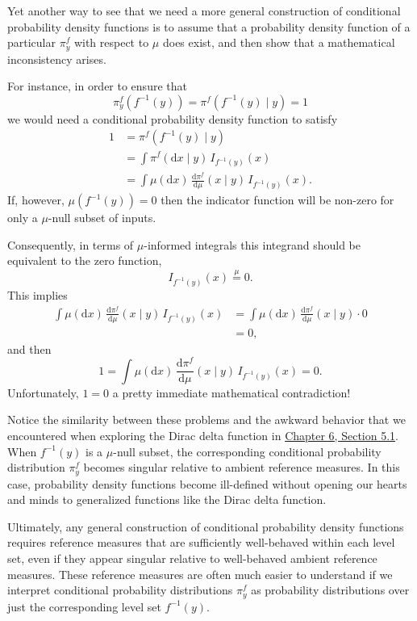 \documentclass[
  letterpaper,
  DIV=11,
  numbers=noendperiod]{scrartcl}
\begin{document}
Yet another way to see that we need a more general construction of
conditional probability density functions is to assume that a
probability density function of a particular \(\pi^{f}_{y}\) with
respect to \(\mu\) does exist, and then show that a mathematical
inconsistency arises.

For instance, in order to ensure that \[
\pi^{f}_{y}( f^{-1}(y) ) = \pi^{f}( f^{-1}(y) \mid y) = 1
\] we would need a conditional probability density function to satisfy
\begin{align*}
1
&=
\pi^{f}( f^{-1}(y) \mid y)
\\
&=
\int \pi^{f}( \mathrm{d} x \mid y) \, I_{f^{-1}(y)}(x)
\\
&=
\int \mu( \mathrm{d} x) \,
\frac{ \mathrm{d}  \pi^{f} }{ \mathrm{d}  \mu  }(x \mid y) \, I_{f^{-1}(y)}(x).
\end{align*} If, however, \(\mu( f^{-1}(y) ) = 0\) then the indicator
function will be non-zero for only a \(\mu\)-null subset of inputs.

Consequently, in terms of \(\mu\)-informed integrals this integrand
should be equivalent to the zero function, \[
I_{f^{-1}(y)}(x) \overset{\mu}{=} 0.
\] This implies \begin{align*}
\int \mu( \mathrm{d} x) \,
\frac{ \mathrm{d}  \pi^{f} }{ \mathrm{d}  \mu  }(x \mid y) \, I_{f^{-1}(y)}(x)
&=
\int \mu( \mathrm{d} x) \,
\frac{ \mathrm{d}  \pi^{f} }{ \mathrm{d}  \mu  }(x \mid y) \cdot 0
\\
&= 0,
\end{align*} and then \[
1 = \int \mu( \mathrm{d} x) \,
\frac{ \mathrm{d}  \pi^{f} }{ \mathrm{d}  \mu  }(x \mid y) \, I_{f^{-1}(y)}(x) = 0.
\] Unfortunately, \(1 = 0\) a pretty immediate mathematical
contradiction!

Notice the similarity between these problems and the awkward behavior
that we encountered when exploring the Dirac delta function in
\href{http://www.symplectomorphic.com/assets/chapters_html/density_functions.html}{Chapter
6, Section 5.1}. When \(f^{-1}(y)\) is a \(\mu\)-null subset, the
corresponding conditional probability distribution \(\pi^{f}_{y}\)
becomes singular relative to ambient reference measures. In this case,
probability density functions become ill-defined without opening our
hearts and minds to generalized functions like the Dirac delta function.

Ultimately, any general construction of conditional probability density
functions requires reference measures that are sufficiently well-behaved
within each level set, even if they appear singular relative to
well-behaved ambient reference measures. These reference measures are
often much easier to understand if we interpret conditional probability
distributions \(\pi^{f}_{y}\) as probability distributions over just the
corresponding level set \(f^{-1}(y)\).
\end{document}
